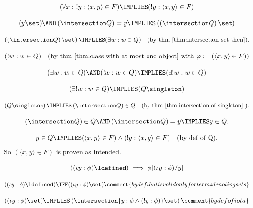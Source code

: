 \[
(\forall x:\ !y : \langle x,y\rangle \in F)
\IMPLIES
(!y : \langle x,y\rangle \in F)
\]

\[
(y\set)
\AND
\left(\intersection Q\right)=y
\IMPLIES
\left(\left(\intersection Q\right)\set\right)
\]

\[
\left(\left(\intersection Q\right)\set\right)
\IMPLIES
(\exists w: w\in Q)
\quad(\mbox{by thm \ref{thm:intersection set then}}).
\]


\[
(!w:w\in Q)
\quad\mbox{(by thm \ref{thm:class with at most one object} with $\varphi:=(\langle x,y\rangle\in F)$)}
\]

\[
(\exists w: w\in Q)
\AND
(! w: w\in Q)
\IMPLIES
(\exists! w: w\in Q)
\]

\[
(\exists! w: w\in Q)
\IMPLIES
(Q\singleton)
\]

\[
\left(Q\singleton\right)
\IMPLIES
\left(\intersection Q\right)\in Q
\quad(\mbox{by thm \ref{thm:intersection of singleton} }).
\]

\[
\left(\intersection Q\right)\in Q
\AND
\left(\intersection Q\right)=y
\IMPLIES
y\in Q.
\]

\[
y\in Q
\IMPLIES
(\langle x,y\rangle\in F)
\land 
(!y: \langle x,y\rangle\in F)
\quad(\mbox{by def of Q}).
\]
So $(\langle x,y\rangle\in F)$ is proven as intended.\\
\Done
\begin{theorem}
\[
((\iota y:\phi)\ldefined)
\implies
\phi[(\iota y:\phi)/y]
\]
\end{theorem}
\Proof
\[
((\iota y:\phi)\ldefined)
\IFF
((\iota y:\phi)\set)
\comment{by def that is valid only for terms denoting sets}
\]

\[
((\iota y:\phi)\set)
\IMPLIES
\left(\intersection\{y:\phi\land(!y:\phi)\}\set\right)
\comment{by def of iota}
\]
\Done

